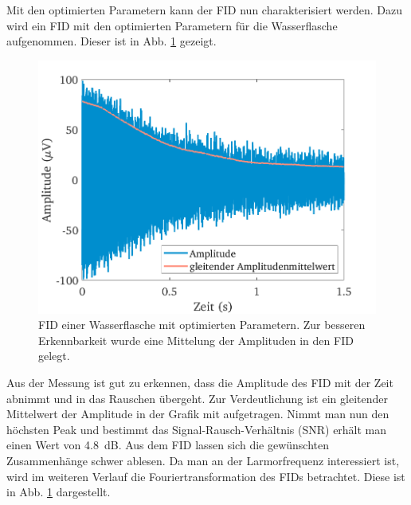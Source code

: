 \documentclass[../main.tex]{subfiles}
\begin{document}
    Mit den optimierten Parametern kann der FID nun charakterisiert werden. Dazu wird ein FID mit den optimierten Parametern für die Wasserflasche aufgenommen. Dieser ist in Abb. \ref{fig:FID_Optimised} gezeigt.
    \begin{figure}[h!]
        \centering
        \includegraphics[width=\textwidth]{Bilddateien/7/Part7_Fig_1.png}
        \caption{FID einer Wasserflasche mit optimierten Parametern. Zur besseren Erkennbarkeit wurde eine Mittelung der Amplituden in den FID gelegt.}
        \label{fig:FID_Optimised}
    \end{figure}
    Aus der Messung ist gut zu erkennen, dass die Amplitude des FID mit der Zeit abnimmt und in das Rauschen übergeht. Zur Verdeutlichung ist ein gleitender Mittelwert der Amplitude in der Grafik mit aufgetragen. Nimmt man nun den höchsten Peak und bestimmt das Signal-Rausch-Verhältnis (SNR) erhält man einen Wert von \SI{4,8}{\deci \bel}. Aus dem FID lassen sich die gewünschten Zusammenhänge schwer ablesen. Da man an der Larmorfrequenz interessiert ist, wird im weiteren Verlauf die Fouriertransformation des FIDs betrachtet. Diese ist in Abb. \ref{fig:FID_Optimised} dargestellt.
\end{document}
